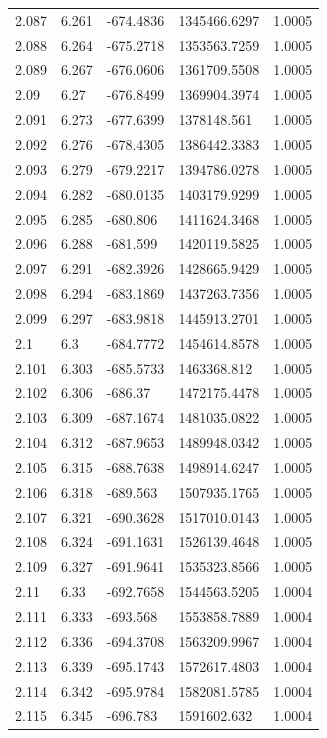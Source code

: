 \begin{tabular}{lllll}
2.087 & 6.261 & -674.4836 & 1345466.6297 & 1.0005 \\
2.088 & 6.264 & -675.2718 & 1353563.7259 & 1.0005 \\
2.089 & 6.267 & -676.0606 & 1361709.5508 & 1.0005 \\
2.09 & 6.27 & -676.8499 & 1369904.3974 & 1.0005 \\
2.091 & 6.273 & -677.6399 & 1378148.561 & 1.0005 \\
2.092 & 6.276 & -678.4305 & 1386442.3383 & 1.0005 \\
2.093 & 6.279 & -679.2217 & 1394786.0278 & 1.0005 \\
2.094 & 6.282 & -680.0135 & 1403179.9299 & 1.0005 \\
2.095 & 6.285 & -680.806 & 1411624.3468 & 1.0005 \\
2.096 & 6.288 & -681.599 & 1420119.5825 & 1.0005 \\
2.097 & 6.291 & -682.3926 & 1428665.9429 & 1.0005 \\
2.098 & 6.294 & -683.1869 & 1437263.7356 & 1.0005 \\
2.099 & 6.297 & -683.9818 & 1445913.2701 & 1.0005 \\
2.1 & 6.3 & -684.7772 & 1454614.8578 & 1.0005 \\
2.101 & 6.303 & -685.5733 & 1463368.812 & 1.0005 \\
2.102 & 6.306 & -686.37 & 1472175.4478 & 1.0005 \\
2.103 & 6.309 & -687.1674 & 1481035.0822 & 1.0005 \\
2.104 & 6.312 & -687.9653 & 1489948.0342 & 1.0005 \\
2.105 & 6.315 & -688.7638 & 1498914.6247 & 1.0005 \\
2.106 & 6.318 & -689.563 & 1507935.1765 & 1.0005 \\
2.107 & 6.321 & -690.3628 & 1517010.0143 & 1.0005 \\
2.108 & 6.324 & -691.1631 & 1526139.4648 & 1.0005 \\
2.109 & 6.327 & -691.9641 & 1535323.8566 & 1.0005 \\
2.11 & 6.33 & -692.7658 & 1544563.5205 & 1.0004 \\
2.111 & 6.333 & -693.568 & 1553858.7889 & 1.0004 \\
2.112 & 6.336 & -694.3708 & 1563209.9967 & 1.0004 \\
2.113 & 6.339 & -695.1743 & 1572617.4803 & 1.0004 \\
2.114 & 6.342 & -695.9784 & 1582081.5785 & 1.0004 \\
2.115 & 6.345 & -696.783 & 1591602.632 & 1.0004 \\

\end{tabular}
